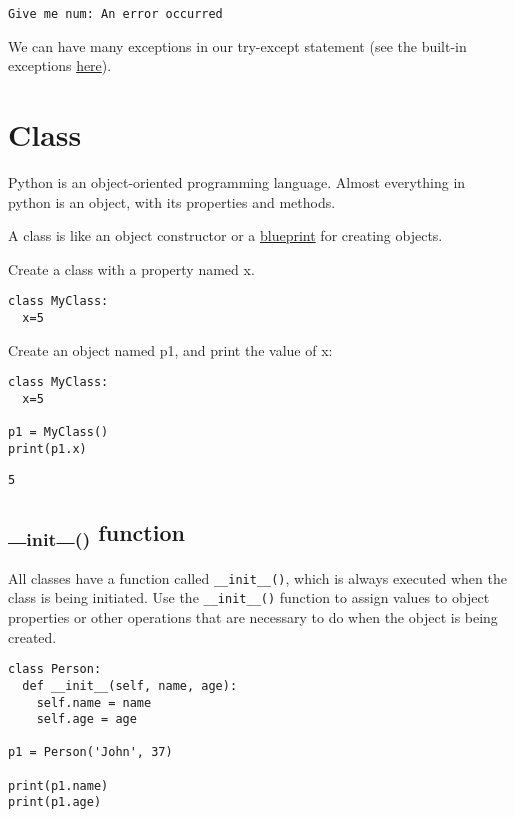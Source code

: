 \documentclass[11pt]{article}
\begin{document}
\begin{verbatim}
Give me num: An error occurred
\end{verbatim}


We can have many exceptions in our try-except statement (see the built-in exceptions \href{https://docs.python.org/3/library/exceptions.html}{here}).





\section{Class}
\label{sec:orgd7e4455}

Python is an object-oriented programming language.
Almost everything in python is an object, with its properties and methods.

A class is like an object constructor or a \uline{blueprint} for creating objects.


Create a class with a property named x.
\begin{verbatim}
class MyClass:
  x=5
\end{verbatim}

Create an object named p1, and print the value of x:
\begin{verbatim}
class MyClass:
  x=5

p1 = MyClass()
print(p1.x)
\end{verbatim}

\begin{verbatim}
5
\end{verbatim}

\subsection{\_\textsubscript{init}\_\textsubscript{()} function}
\label{sec:orgf43601b}

All classes have a function called \texttt{\_\_init\_\_()}, which is always executed when the class is being initiated.
Use the \texttt{\_\_init\_\_()} function to assign values to object properties or other operations that are necessary to do when the object is being created.


\begin{verbatim}
class Person:
  def __init__(self, name, age):
    self.name = name
    self.age = age

p1 = Person('John', 37)

print(p1.name)
print(p1.age)
\end{verbatim}
\end{document}

